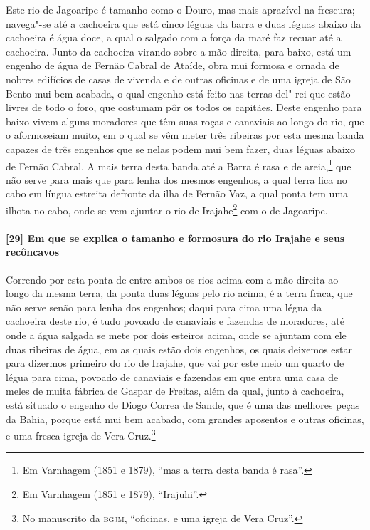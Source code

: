\begin{linenumbers}
Este rio de Jagoaripe é tamanho como o Douro, mas mais aprazível na frescura; navega"-se
até a cachoeira que está cinco léguas da barra e duas léguas abaixo da cachoeira é água
doce, a qual o salgado com a força da maré faz recuar até a cachoeira. Junto da cachoeira
virando sobre a mão direita, para baixo, está um engenho de água de Fernão Cabral de
Ataíde, obra mui formosa e ornada de nobres edifícios de casas de vivenda e de outras
oficinas e de uma igreja de São Bento mui bem acabada, o qual engenho está feito nas
terras del"-rei que estão livres de todo o foro, que costumam pôr os todos os capitães.
Deste engenho para baixo vivem alguns
moradores que têm suas roças e canaviais ao longo do rio, que o aformoseiam muito, em o
qual se vêm meter três ribeiras por esta mesma banda capazes de três engenhos que se nelas
podem mui bem fazer, duas léguas abaixo de Fernão Cabral. A mais terra desta banda até a
Barra é rasa e de areia,\footnote{ Em Varnhagem (1851 e 1879), ``mas a terra desta banda é
rasa''.} que não serve para mais que para lenha dos mesmos engenhos, a qual terra fica no
cabo em língua estreita defronte da ilha de Fernão Vaz, a qual ponta tem uma ilhota no
cabo, onde se vem ajuntar o rio de Irajahe\footnote{ Em Varnhagem (1851 e 1879),
``Irajuhi''.} com o de Jagoaripe.

\paragraph{[29] Em que se explica o tamanho e formosura do rio Irajahe e seus recôncavos}\quad
Correndo por esta ponta de entre ambos os rios acima com a mão direita ao longo da mesma
terra, da ponta duas léguas pelo rio acima, é a terra fraca, que não serve senão para
lenha dos engenhos; daqui para cima uma légua da cachoeira deste rio, é tudo povoado de
canaviais e fazendas de moradores, até onde a água salgada se mete por dois esteiros
acima, onde se ajuntam com ele duas ribeiras de água, em as quais estão dois engenhos, os
quais deixemos estar para dizermos primeiro do rio de Irajahe, que vai por este meio um
quarto de légua para cima, povoado de canaviais e fazendas em que entra uma casa de meles
de muita fábrica de Gaspar de Freitas, além da qual, junto à cachoeira, está situado o
engenho de Diogo Correa de Sande, que é uma das melhores peças da Bahia, porque está mui
bem acabado, com grandes aposentos e outras oficinas, e uma fresca igreja de Vera
Cruz.\footnote{ No manuscrito da \textsc{bgjm}, ``oficinas, e uma igreja de Vera Cruz''.}


\end{linenumbers}
